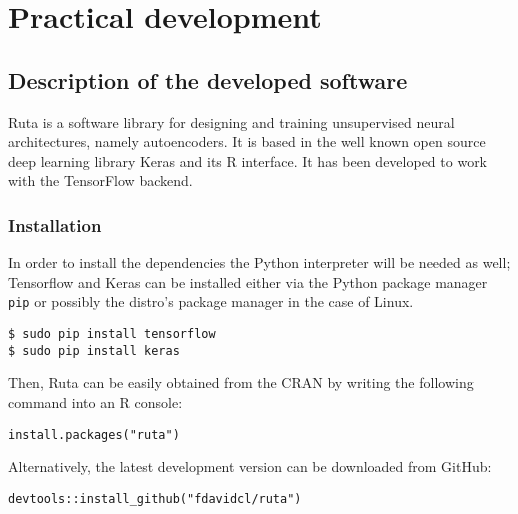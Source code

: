 \documentclass[oneside,openright,titlepage,numbers=noenddot,openany,headinclude,footinclude=true,
cleardoublepage=empty,abstractoff,BCOR=5mm,paper=a4,fontsize=12pt,main=spanish]{scrreprt}
\begin{document}



\part{Practical development}
\label{p.practice}

\chapter{Description of the developed software}

Ruta is a software library for designing and training unsupervised neural architectures, namely autoencoders. It is based in the well known open source deep learning library Keras \cite{Keras} and its R interface. It has been developed to work with the TensorFlow \cite{Tensorflow} backend.

\section{Installation}

In order to install the dependencies the Python interpreter will be needed as well; Tensorflow and Keras can be installed either via the Python package manager \texttt{pip} or possibly the distro’s package manager in the case of Linux.
\begin{verbatim}
$ sudo pip install tensorflow
$ sudo pip install keras
\end{verbatim}

Then,  Ruta can be easily obtained from the CRAN by writing the following command into an R console:
\begin{verbatim}
install.packages("ruta")  
\end{verbatim}

Alternatively, the latest development version can be downloaded from GitHub:
\begin{verbatim}
devtools::install_github("fdavidcl/ruta")
\end{verbatim}
\end{document}
